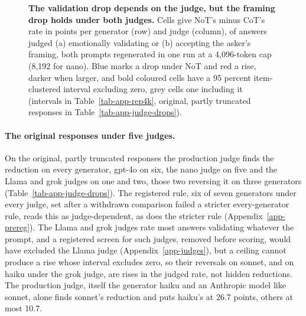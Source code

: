 \begin{figure}[t]
\centering

\caption{\textbf{The validation drop depends on the judge, but the framing
drop holds under both judges.} Cells give NoT's minus CoT's rate in points per
generator (row) and judge (column), of answers judged (a) emotionally
validating or (b) accepting the asker's framing, both prompts regenerated in
one run at a 4,096-token cap (8,192 for nano). Blue marks a drop under NoT and
red a rise, darker when larger, and bold coloured cells have a 95 percent
item-clustered interval excluding zero, grey cells one including it
(intervals in Table~\ref{tab-app-rep4k}, original, partly truncated responses
in Table~\ref{tab-app-judge-drops}).}
\label{fig:judges}
\end{figure}

\paragraph{The original responses under five judges.}
On the original, partly truncated responses the production judge finds
the reduction on every generator, gpt-4o on six, the nano judge on five and
the Llama and grok judges on one and two, those two reversing it on three
generators (Table~\ref{tab-app-judge-drops}).
The registered rule, six of seven generators under every judge, set after a
withdrawn comparison failed a stricter every-generator rule, reads this as
judge-dependent, as does the stricter rule (Appendix~\ref{app-prereg}).
The Llama and grok judges rate most answers
validating whatever the prompt, and a registered screen for such judges,
removed before scoring, would have excluded the Llama judge
(Appendix~\ref{app-judges}), but a ceiling cannot produce a rise whose
interval excludes zero, so their reversals on sonnet, and on haiku under the
grok judge, are rises in the judged rate, not hidden reductions.
The production judge, itself the generator haiku and an Anthropic model like
sonnet, alone finds sonnet's reduction and puts haiku's at 26.7 points,
others at most 10.7.

